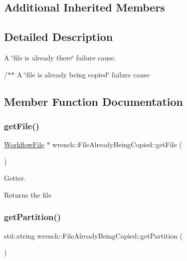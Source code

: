 \subsection*{Additional Inherited Members}


\subsection{Detailed Description}
A \char`\"{}file is already there\char`\"{} failure cause. 

/$\ast$$\ast$ A \char`\"{}file is already being copied\char`\"{} failure cause 

\subsection{Member Function Documentation}
\mbox{\label{classwrench_1_1_file_already_being_copied_a4bb8bd28c57ad1c9a37985b45f5005f4}} 
\subsubsection{\texorpdfstring{get\+File()}{getFile()}}
{\footnotesize\ttfamily \hyperlink{classwrench_1_1_workflow_file}{Workflow\+File} $\ast$ wrench\+::\+File\+Already\+Being\+Copied\+::get\+File (\begin{DoxyParamCaption}{ }\end{DoxyParamCaption})}



Getter. 

\begin{DoxyReturn}{Returns}
the file 
\end{DoxyReturn}
\mbox{\label{classwrench_1_1_file_already_being_copied_af1e681d40a77ced81ce05fa49f1fabf5}} 
\subsubsection{\texorpdfstring{get\+Partition()}{getPartition()}}
{\footnotesize\ttfamily std\+::string wrench\+::\+File\+Already\+Being\+Copied\+::get\+Partition (\begin{DoxyParamCaption}{ }\end{DoxyParamCaption})}



